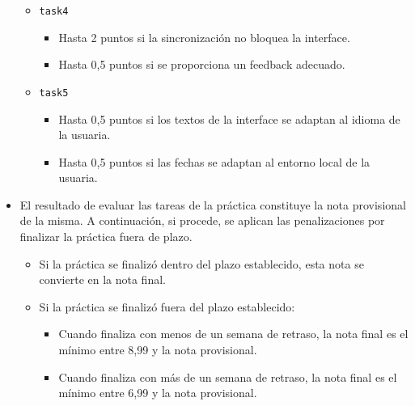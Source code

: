 \documentclass[11pt,a4paper]{article}
\begin{document}
\begin{itemize}
\begin{itemize}
  \item \texttt{task4}

    \begin{itemize}
    \item Hasta 2 puntos si la sincronización no bloquea la interface.
    \item Hasta 0,5 puntos si se proporciona un feedback adecuado.
    \end{itemize}

  \item \texttt{task5}

    \begin{itemize}
    \item Hasta 0,5 puntos si los textos de la interface se adaptan
      al idioma de la usuaria.
    \item Hasta 0,5 puntos si las fechas se adaptan al entorno local
      de la usuaria.
    \end{itemize}
  \end{itemize}

\item El resultado de evaluar las tareas de la práctica constituye la
  nota provisional de la misma. A continuación, si procede, se aplican
  las penalizaciones por finalizar la práctica fuera de plazo.

  \begin{itemize}
  \item Si la práctica se finalizó dentro del plazo establecido, esta
    nota se convierte en la nota final.
  \item Si la práctica se finalizó fuera del plazo establecido:
    \begin{itemize}
    \item Cuando finaliza con menos de un semana de retraso, la nota
      final es el mínimo entre 8,99 y la nota provisional.
    \item Cuando finaliza con más de un semana de retraso, la nota
      final es el mínimo entre 6,99 y la nota provisional.
    \end{itemize}
  \end{itemize}

\end{itemize}
\end{document}
